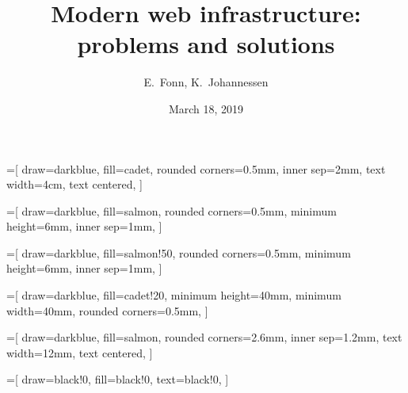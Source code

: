 \documentclass{beamer}
\begin{document}
\title[Modern web infrastructure]{
  Modern web infrastructure: problems and solutions
}

\author[E.~Fonn]{E.~Fonn, K.~Johannessen}

\date[Mar 18, 2019]{March 18, 2019}


\begin{frame}
  \titlepage
\end{frame}


=[
    draw=darkblue,
    fill=cadet,
    rounded corners=0.5mm,
    inner sep=2mm,
    text width=4cm,
    text centered,
]

=[
    draw=darkblue,
    fill=salmon,
    rounded corners=0.5mm,
    minimum height=6mm,
    inner sep=1mm,
]

=[
    draw=darkblue,
    fill=salmon!50,
    rounded corners=0.5mm,
    minimum height=6mm,
    inner sep=1mm,
]

=[
    draw=darkblue,
    fill=cadet!20,
    minimum height=40mm,
    minimum width=40mm,
    rounded corners=0.5mm,
]

=[
    draw=darkblue,
    fill=salmon,
    rounded corners=2.6mm,
    inner sep=1.2mm,
    text width=12mm,
    text centered,
]

=[
    draw=black!0,
    fill=black!0,
    text=black!0,
]


\end{document}
